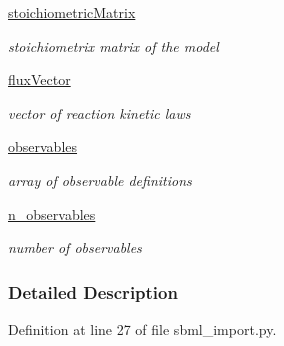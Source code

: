 \begin{DoxyCompactItemize}
\mbox{\label{classamici_1_1sbml__import_1_1_sbml_importer_ad30bd1a098329211e7618dd1065d7067}} 
\mbox{\hyperlink{classamici_1_1sbml__import_1_1_sbml_importer_ad30bd1a098329211e7618dd1065d7067}{stoichiometric\+Matrix}}
\begin{DoxyCompactList}\small\item\em stoichiometrix matrix of the model \end{DoxyCompactList}\item 
\mbox{\label{classamici_1_1sbml__import_1_1_sbml_importer_aa7c12a1cbbde8c960bfaae2ac64f8845}} 
\mbox{\hyperlink{classamici_1_1sbml__import_1_1_sbml_importer_aa7c12a1cbbde8c960bfaae2ac64f8845}{flux\+Vector}}
\begin{DoxyCompactList}\small\item\em vector of reaction kinetic laws \end{DoxyCompactList}\item 
\mbox{\label{classamici_1_1sbml__import_1_1_sbml_importer_a9617913dfb4b9fa413012566e226bee0}} 
\mbox{\hyperlink{classamici_1_1sbml__import_1_1_sbml_importer_a9617913dfb4b9fa413012566e226bee0}{observables}}
\begin{DoxyCompactList}\small\item\em array of observable definitions \end{DoxyCompactList}\item 
\mbox{\label{classamici_1_1sbml__import_1_1_sbml_importer_a248b9c939f3da7c24bb87c7ddf76e0ff}} 
\mbox{\hyperlink{classamici_1_1sbml__import_1_1_sbml_importer_a248b9c939f3da7c24bb87c7ddf76e0ff}{n\+\_\+observables}}
\begin{DoxyCompactList}\small\item\em number of observables \end{DoxyCompactList}\end{DoxyCompactItemize}


\subsubsection{Detailed Description}


Definition at line 27 of file sbml\+\_\+import.\+py.




